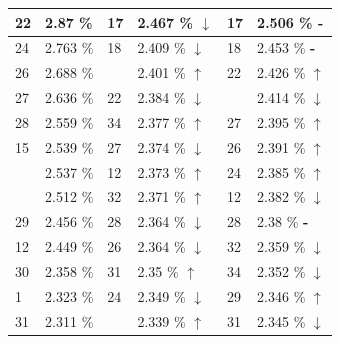 \documentclass[letterpaper]{article}
\newcommand{\caseUp}[1][]{#1\textcolor[HTML]{008000}{$\mathbf{\uparrow}$}}
\newcommand{\caseStable}[1][]{#1\textcolor[HTML]{3779dd}{\textbf{-}}}
\newcommand{\caseDown}[1][]{#1\textcolor[HTML]{dd3737}{$\mathbf{\downarrow}$}}
\begin{document}
\begin{table}
\begin{tabular}{|l|l||l|l||l|l|}
	  \cellcolor[HTML]{FF4500} 22 & 2.87 \% & \cellcolor[HTML]{FF8C00} 17 & 2.467 \% \caseDown[\hfill] & \cellcolor[HTML]{FF8C00} 17 & 2.506 \% \caseStable[\hfill] \\ \hline
	  \cellcolor[HTML]{FF4500} 24 & 2.763 \% & \cellcolor[HTML]{EEEED1} 18 & 2.409 \% \caseDown[\hfill] & \cellcolor[HTML]{EEEED1} 18 & 2.453 \% \caseStable[\hfill] \\ \hline
	  \cellcolor[HTML]{E6E6FA} 26 & 2.688 \% & \cellcolor[HTML]{000000} \textcolor{white}{43} & 2.401 \% \caseUp[\hfill] & \cellcolor[HTML]{FF4500} 22 & 2.426 \% \caseUp[\hfill] \\ \hline
	  \cellcolor[HTML]{FFD700} 27 & 2.636 \% & \cellcolor[HTML]{FF4500} 22 & 2.384 \% \caseDown[\hfill] & \cellcolor[HTML]{000000} \textcolor{white}{43} & 2.414 \% \caseDown[\hfill] \\ \hline
	  \cellcolor[HTML]{FFD700} 28 & 2.559 \% & \cellcolor[HTML]{EEEED1} 34 & 2.377 \% \caseUp[\hfill] & \cellcolor[HTML]{FFD700} 27 & 2.395 \% \caseUp[\hfill] \\ \hline
	  \cellcolor[HTML]{FF69B4} 15 & 2.539 \% & \cellcolor[HTML]{FFD700} 27 & 2.374 \% \caseDown[\hfill] & \cellcolor[HTML]{E6E6FA} 26 & 2.391 \% \caseUp[\hfill] \\ \hline
	  \cellcolor[HTML]{000000} \textcolor{white}{42} & 2.537 \% & \cellcolor[HTML]{FF69B4} 12 & 2.373 \% \caseUp[\hfill] & \cellcolor[HTML]{FF4500} 24 & 2.385 \% \caseUp[\hfill] \\ \hline
	  \cellcolor[HTML]{000000} \textcolor{white}{43} & 2.512 \% & \cellcolor[HTML]{2E8B57} 32 & 2.371 \% \caseUp[\hfill] & \cellcolor[HTML]{FF69B4} 12 & 2.382 \% \caseDown[\hfill] \\ \hline
	  \cellcolor[HTML]{FFFFF0} 29 & 2.456 \% & \cellcolor[HTML]{FFD700} 28 & 2.364 \% \caseDown[\hfill] & \cellcolor[HTML]{FFD700} 28 & 2.38 \% \caseStable[\hfill] \\ \hline
	  \cellcolor[HTML]{FF69B4} 12 & 2.449 \% & \cellcolor[HTML]{E6E6FA} 26 & 2.364 \% \caseDown[\hfill] & \cellcolor[HTML]{2E8B57} 32 & 2.359 \% \caseDown[\hfill] \\ \hline
	  \cellcolor[HTML]{FFD700} 30 & 2.358 \% & \cellcolor[HTML]{BEBEBE} 31 & 2.35 \% \caseUp[\hfill] & \cellcolor[HTML]{EEEED1} 34 & 2.352 \% \caseDown[\hfill] \\ \hline
	  \cellcolor[HTML]{FFFFFF} 1 & 2.323 \% & \cellcolor[HTML]{FF4500} 24 & 2.349 \% \caseDown[\hfill] & \cellcolor[HTML]{FFFFF0} 29 & 2.346 \% \caseUp[\hfill] \\ \hline
	  \cellcolor[HTML]{BEBEBE} 31 & 2.311 \% & \cellcolor[HTML]{483D8B} \textcolor{white}{40} & 2.339 \% \caseUp[\hfill] & \cellcolor[HTML]{BEBEBE} 31 & 2.345 \% \caseDown[\hfill] \\ \hline

\end{tabular}
\end{table}
\end{document}
